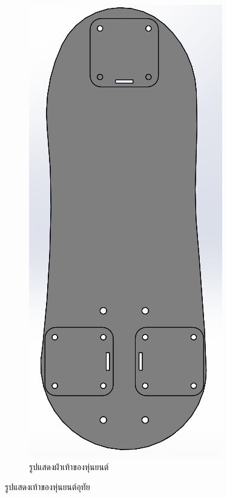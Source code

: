\begin{figure}[!ht]
\begin{subfigure}[b]{0.2\linewidth}
    \includegraphics[width=\linewidth]{chapter4/images/bare_footold.PNG}
    \caption{รูปแสดงฝ่าเท้าของหุ่นยนต์}
  \end{subfigure}
  \caption{รูปแสดงเท้าของหุ่นยนต์อุทัย}
  \label{fig:footold}
\end{figure}

